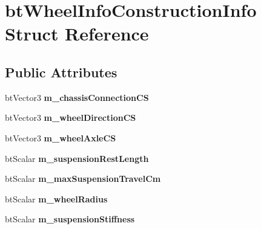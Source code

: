 \hypertarget{structbt_wheel_info_construction_info}{\section{bt\+Wheel\+Info\+Construction\+Info Struct Reference}
\label{structbt_wheel_info_construction_info}
}
\subsection*{Public Attributes}
\begin{DoxyCompactItemize}
\item 
\hypertarget{structbt_wheel_info_construction_info_ace9733519c81df42d2362231ec68eaae}{bt\+Vector3 {\bfseries m\+\_\+chassis\+Connection\+C\+S}}\label{structbt_wheel_info_construction_info_ace9733519c81df42d2362231ec68eaae}

\item 
\hypertarget{structbt_wheel_info_construction_info_a37851da19fce1c3ef01c65ec60ea7154}{bt\+Vector3 {\bfseries m\+\_\+wheel\+Direction\+C\+S}}\label{structbt_wheel_info_construction_info_a37851da19fce1c3ef01c65ec60ea7154}

\item 
\hypertarget{structbt_wheel_info_construction_info_a35f8baf5ada324e7d60e3a3b51d17e00}{bt\+Vector3 {\bfseries m\+\_\+wheel\+Axle\+C\+S}}\label{structbt_wheel_info_construction_info_a35f8baf5ada324e7d60e3a3b51d17e00}

\item 
\hypertarget{structbt_wheel_info_construction_info_a0a57ff5c5688b689a766583e058c8183}{bt\+Scalar {\bfseries m\+\_\+suspension\+Rest\+Length}}\label{structbt_wheel_info_construction_info_a0a57ff5c5688b689a766583e058c8183}

\item 
\hypertarget{structbt_wheel_info_construction_info_abc6f20187127b76600a6abec4e070c3d}{bt\+Scalar {\bfseries m\+\_\+max\+Suspension\+Travel\+Cm}}\label{structbt_wheel_info_construction_info_abc6f20187127b76600a6abec4e070c3d}

\item 
\hypertarget{structbt_wheel_info_construction_info_a762cacf6a7c9892039a55ae1a35d4833}{bt\+Scalar {\bfseries m\+\_\+wheel\+Radius}}\label{structbt_wheel_info_construction_info_a762cacf6a7c9892039a55ae1a35d4833}

\item 
\hypertarget{structbt_wheel_info_construction_info_ac7fa423c96deb5101767072cea14341e}{bt\+Scalar {\bfseries m\+\_\+suspension\+Stiffness}}\label{structbt_wheel_info_construction_info_ac7fa423c96deb5101767072cea14341e}


\end{DoxyCompactItemize}
